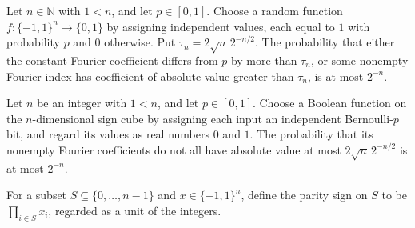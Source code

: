 \begin{theorem}
\label{FABL.measure_pBiasedRandomFunction_fourierFailure_le}
\leanok
{}
Let $n\in\mathbb{N}$ with $1<n$, and let $p\in[0,1]$. Choose a random function
$f:\{-1,1\}^n\to\{0,1\}$ by assigning independent values, each equal to $1$ with
probability $p$ and $0$ otherwise. Put $\tau_n=2\sqrt n\,2^{-n/2}$. The probability that
either the constant Fourier coefficient differs from $p$ by more than $\tau_n$, or some
nonempty Fourier index has coefficient of absolute value greater than $\tau_n$, is at
most $2^{-n}$.
\end{theorem}

\begin{theorem}
\label{FABL.measure_pBiasedRandomFunction_not_isFourierRegular_le}
\leanok
{}
Let $n$ be an integer with $1<n$, and let $p\in[0,1]$. Choose a Boolean function on the
$n$-dimensional sign cube by assigning each input an independent Bernoulli-$p$ bit, and
regard its values as real numbers $0$ and $1$. The probability that its nonempty Fourier
coefficients do not all have absolute value at most $2\sqrt{n}\,2^{-n/2}$ is at most
$2^{-n}$.
\end{theorem}

\begin{definition}
\label{FABL.randomBooleanParitySign}
\leanok
{}
For a subset $S\subseteq\{0,\ldots,n-1\}$ and $x\in\{−1,1\}^n$, define the parity sign
on $S$ to be $\prod_{i\in S}x_i$, regarded as a unit of the integers.
\end{definition}

